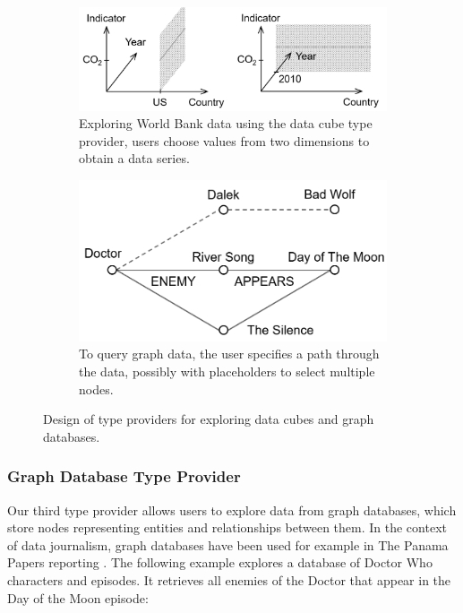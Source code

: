 \documentclass[manuscript,review,anonymous]{acmart}
\begin{document}
\begin{figure}
\centering
\begin{subfigure}[b]{0.5\textwidth}
  \centering
  \includegraphics[scale=0.25]{figures/cubetp}
  \vspace{0.5em}
  \caption{Exploring World Bank data using the data cube type provider, users
    choose values from two dimensions to obtain a data series.}
  \label{fig:cubetp}
\end{subfigure}
\hfill
\begin{subfigure}[b]{0.45\textwidth}
  \centering
  \includegraphics[scale=0.28]{figures/graphtp}
  \caption{To query graph data, the user specifies a path through the data, possibly with
    placeholders to select multiple nodes.}
  \label{fig:graphtp}
\end{subfigure}
\vspace{-0.5em}
\caption{Design of type providers for exploring data cubes and graph databases.}
\label{fig:three graphs}
\end{figure}


\subsubsection*{Graph Database Type Provider}
Our third type provider allows users to explore data from graph databases, which store
nodes representing entities and relationships between them. In the context of data journalism,
graph databases have been used for example in The Panama Papers reporting \cite{panama}.
The following example explores a database of Doctor Who characters and episodes. It retrieves
all enemies of the Doctor that appear in the Day of the Moon episode:
\end{document}
